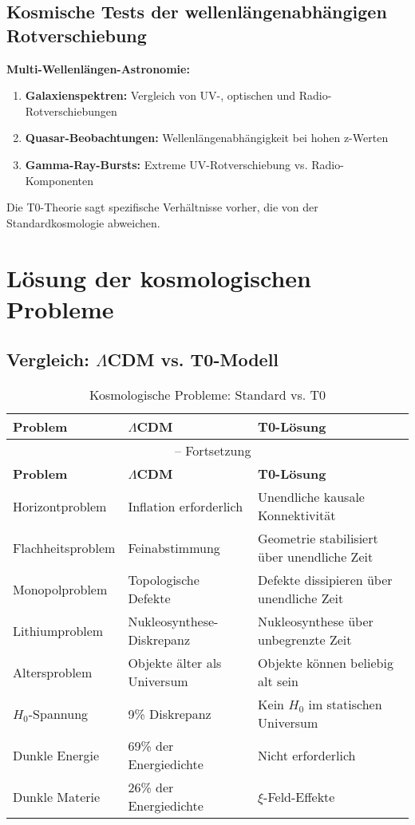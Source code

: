 \documentclass[12pt,a4paper]{article}
\begin{document}
	\subsection{Kosmische Tests der wellenlängenabhängigen Rotverschiebung}
	
	\begin{experiment}
		\textbf{Multi-Wellenlängen-Astronomie:}
		
		\begin{enumerate}
			\item \textbf{Galaxienspektren:} Vergleich von UV-, optischen und Radio-Rotverschiebungen
			\item \textbf{Quasar-Beobachtungen:} Wellenlängenabhängigkeit bei hohen z-Werten
			\item \textbf{Gamma-Ray-Bursts:} Extreme UV-Rotverschiebung vs. Radio-Komponenten
		\end{enumerate}
		
		Die T0-Theorie sagt spezifische Verhältnisse vorher, die von der Standardkosmologie abweichen.
	\end{experiment}
	
	\section{Lösung der kosmologischen Probleme}
	
	\subsection{Vergleich: $\Lambda$CDM vs. T0-Modell}
	
	\begin{longtable}{p{4cm}p{4.5cm}p{4.5cm}}
		\caption{Kosmologische Probleme: Standard vs. T0} \\
		\toprule
		\textbf{Problem} & \textbf{$\Lambda$CDM} & \textbf{T0-Lösung} \\
		\midrule
		\endfirsthead
		\multicolumn{3}{c}{\tablename\ \thetable{} -- Fortsetzung} \\
		\toprule
		\textbf{Problem} & \textbf{$\Lambda$CDM} & \textbf{T0-Lösung} \\
		\midrule
		\endhead
		Horizontproblem & Inflation erforderlich & Unendliche kausale Konnektivität \\
		Flachheitsproblem & Feinabstimmung & Geometrie stabilisiert über unendliche Zeit \\
		Monopolproblem & Topologische Defekte & Defekte dissipieren über unendliche Zeit \\
		Lithiumproblem & Nukleosynthese-Diskrepanz & Nukleosynthese über unbegrenzte Zeit \\
		Altersproblem & Objekte älter als Universum & Objekte können beliebig alt sein \\
		$H_0$-Spannung & 9\% Diskrepanz & Kein $H_0$ im statischen Universum \\
		Dunkle Energie & 69\% der Energiedichte & Nicht erforderlich \\
		Dunkle Materie & 26\% der Energiedichte & $\xi$-Feld-Effekte \\
		\bottomrule
	\end{longtable}
	
\end{document}
